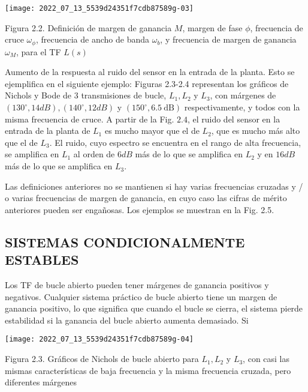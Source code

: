 \texttt{[image: 2022\_07\_13\_5539d24351f7cdb87589g-03]}

Figura 2.2. Definición de margen de ganancia $M$, margen de fase $\phi$, frecuencia de cruce $\omega_{\phi}$, frecuencia de ancho de banda $\omega_{b}$, y frecuencia de margen de ganancia $\omega_{M}$, para el TF $L(s)$

Aumento de la respuesta al ruido del sensor en la entrada de la planta. Esto se ejemplifica en el siguiente ejemplo: Figuras 2.3-2.4 representan los gráficos de Nichols y Bode de 3 transmisiones de bucle, $L_{1}, L_{2}$ y $L_{3}$, con márgenes de $\left(130^{\circ}, 14 d B\right),\left(140^{\circ}, 12 d B\right)$ y $\left(150^{\circ}, 6.5 \mathrm{~dB}\right)$ respectivamente, y todos con la misma frecuencia de cruce. A partir de la Fig. $2.4$, el ruido del sensor en la entrada de la planta de $L_{1}$ es mucho mayor que el de $L_{2}$, que es mucho más alto que el de $L_{3}$. El ruido, cuyo espectro se encuentra en el rango de alta frecuencia, se amplifica en $L_{1}$ al orden de $ 6 d B$ más de lo que se amplifica en $L_{2}$ y en $ 16 d B$ más de lo que se amplifica en $L_{3}$.

Las definiciones anteriores no se mantienen si hay varias frecuencias cruzadas y / o varias frecuencias de margen de ganancia, en cuyo caso las cifras de mérito anteriores pueden ser engañosas. Los ejemplos se muestran en la Fig. 2.5.

\subsection{SISTEMAS CONDICIONALMENTE ESTABLES}
Los TF de bucle abierto pueden tener márgenes de ganancia positivos y negativos. Cualquier sistema práctico de bucle abierto tiene un margen de ganancia positivo, lo que significa que cuando el bucle se cierra, el sistema pierde estabilidad si la ganancia del bucle abierto aumenta demasiado. Si

\texttt{[image: 2022\_07\_13\_5539d24351f7cdb87589g-04]}

Figura 2.3. Gráficos de Nichols de bucle abierto para $L_{1}, L_{2}$ y $L_{3}$, con casi las mismas características de baja frecuencia y la misma frecuencia cruzada, pero diferentes márgenes

